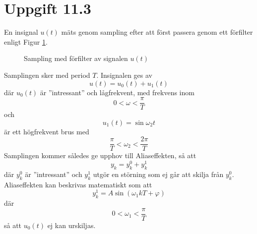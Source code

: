 \documentclass[12pt]{article}
\begin{document}
\section*{Uppgift 11.3}
En insignal $u(t)$ mäts genom sampling efter att först passera genom ett förfilter enligt Figur \ref{fig:filtersamp}. 

\begin{figure}[h!]
  \centering
  \caption{Sampling med förfilter av signalen $u(t)$}
  \label{fig:filtersamp}
\end{figure}
\FloatBarrier
Samplingen sker med period $T$. Insignalen ges av 
\[u(t) = u_0(t) + u_1(t)\]
där $u_0(t)$ är ''intressant'' och lågfrekvent, med frekvens inom 
\[0 < \omega < \frac{\pi}{T}\]
och 
\[u_1(t) = \sin{\omega_2 t}\]
är ett högfrekvent brus med 
\[\frac{\pi}{T} < \omega_2 < \frac{2\pi}{T}\]
Samplingen kommer således ge upphov till Aliaseffekten, så att 
\[y_k = y_k^{0} + y_k^{1}\]
där $y_k^{0}$ är ''intressant'' och $y_k^{1}$ utgör en störning som ej går att skilja från $y_k^{0}$. Aliaseffekten kan beskrivas matematiskt som att 
\[y_k^{1} = A \sin{(\omega_1 kT + \varphi)}\]
där 
\[0 < \omega_1 < \frac{\pi}{T}\]
så att $u_0(t)$ ej kan urskiljas.
\end{document}
